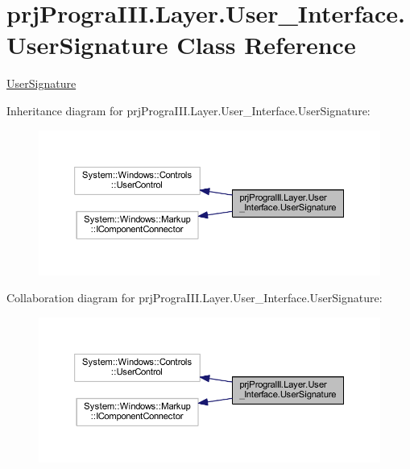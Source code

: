 \hypertarget{classprj_progra_i_i_i_1_1_layer_1_1_user___interface_1_1_user_signature}{}\section{prj\+Progra\+I\+I\+I.\+Layer.\+User\+\_\+\+Interface.\+User\+Signature Class Reference}
\label{classprj_progra_i_i_i_1_1_layer_1_1_user___interface_1_1_user_signature}


\hyperlink{classprj_progra_i_i_i_1_1_layer_1_1_user___interface_1_1_user_signature}{User\+Signature}  




Inheritance diagram for prj\+Progra\+I\+I\+I.\+Layer.\+User\+\_\+\+Interface.\+User\+Signature\+:
\nopagebreak
\begin{figure}[H]
\begin{center}
\leavevmode
\includegraphics[width=350pt]{classprj_progra_i_i_i_1_1_layer_1_1_user___interface_1_1_user_signature__inherit__graph}
\end{center}
\end{figure}


Collaboration diagram for prj\+Progra\+I\+I\+I.\+Layer.\+User\+\_\+\+Interface.\+User\+Signature\+:
\nopagebreak
\begin{figure}[H]
\begin{center}
\leavevmode
\includegraphics[width=350pt]{classprj_progra_i_i_i_1_1_layer_1_1_user___interface_1_1_user_signature__coll__graph}
\end{center}
\end{figure}
